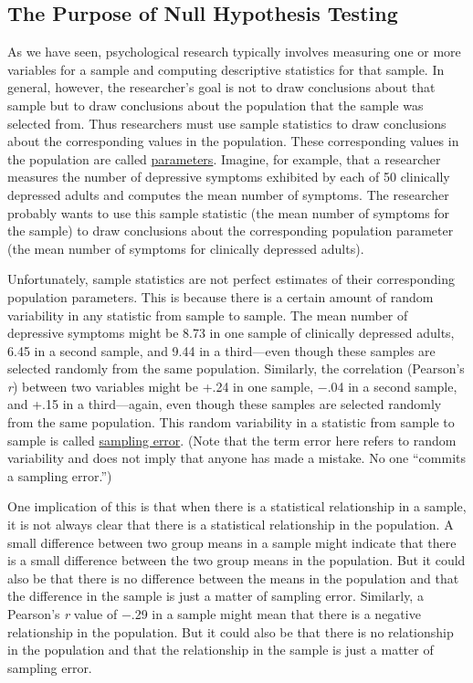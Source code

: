 \documentclass[
]{krantz}
\begin{document}
\subsection*{The Purpose of Null Hypothesis Testing}\label{the-purpose-of-null-hypothesis-testing}


As we have seen, psychological research typically involves measuring one or more variables for a sample and computing descriptive statistics for that sample. In general, however, the researcher's goal is not to draw conclusions about that sample but to draw conclusions about the population that the sample was selected from. Thus researchers must use sample statistics to draw conclusions about the corresponding values in the population. These corresponding values in the population are called \hyperref[parameter]{parameters}. Imagine, for example, that a researcher measures the number of depressive symptoms exhibited by each of 50 clinically depressed adults and computes the mean number of symptoms. The researcher probably wants to use this sample statistic (the mean number of symptoms for the sample) to draw conclusions about the corresponding population parameter (the mean number of symptoms for clinically depressed adults).

Unfortunately, sample statistics are not perfect estimates of their corresponding population parameters. This is because there is a certain amount of random variability in any statistic from sample to sample. The mean number of depressive symptoms might be 8.73 in one sample of clinically depressed adults, 6.45 in a second sample, and 9.44 in a third---even though these samples are selected randomly from the same population. Similarly, the correlation (Pearson's \emph{r}) between two variables might be +.24 in one sample, −.04 in a second sample, and +.15 in a third---again, even though these samples are selected randomly from the same population. This random variability in a statistic from sample to sample is called \hyperref[sampling-error]{sampling error}. (Note that the term error here refers to random variability and does not imply that anyone has made a mistake. No one ``commits a sampling error.'')

One implication of this is that when there is a statistical relationship in a sample, it is not always clear that there is a statistical relationship in the population. A small difference between two group means in a sample might indicate that there is a small difference between the two group means in the population. But it could also be that there is no difference between the means in the population and that the difference in the sample is just a matter of sampling error. Similarly, a Pearson's \emph{r} value of −.29 in a sample might mean that there is a negative relationship in the population. But it could also be that there is no relationship in the population and that the relationship in the sample is just a matter of sampling error.
\end{document}
